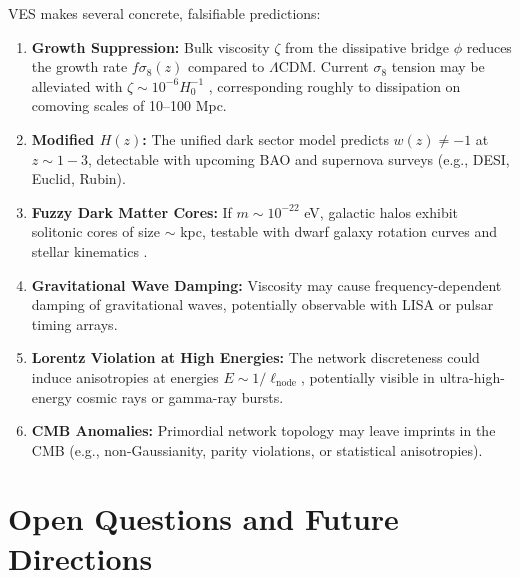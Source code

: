 \documentclass[12pt,a4paper]{book}
\begin{document}
VES makes several concrete, falsifiable predictions:
\begin{enumerate}
    \item \textbf{Growth Suppression:} Bulk viscosity $\zeta$ from the dissipative bridge $\phi$ reduces the growth rate $f\sigma_8(z)$ compared to $\Lambda$CDM. Current $\sigma_8$ tension may be alleviated with $\zeta \sim 10^{-6} H_0^{-1}$ \cite{ashoorioon2023}, corresponding roughly to dissipation on comoving scales of 10–100 Mpc.
    \item \textbf{Modified $H(z)$:} The unified dark sector model predicts $w(z) \neq -1$ at $z \sim 1-3$, detectable with upcoming BAO and supernova surveys (e.g., DESI, Euclid, Rubin).
    \item \textbf{Fuzzy Dark Matter Cores:} If $m \sim 10^{-22}$ eV, galactic halos exhibit solitonic cores of size $\sim$ kpc, testable with dwarf galaxy rotation curves and stellar kinematics \cite{hu2000fuzzy, schive2014core}.
    \item \textbf{Gravitational Wave Damping:} Viscosity may cause frequency-dependent damping of gravitational waves, potentially observable with LISA or pulsar timing arrays.
    \item \textbf{Lorentz Violation at High Energies:} The network discreteness could induce anisotropies at energies $E \sim 1/\ell_{\text{node}}$, potentially visible in ultra-high-energy cosmic rays or gamma-ray bursts.
    \item \textbf{CMB Anomalies:} Primordial network topology may leave imprints in the CMB (e.g., non-Gaussianity, parity violations, or statistical anisotropies).
\end{enumerate}

\section{Open Questions and Future Directions}
\end{document}
